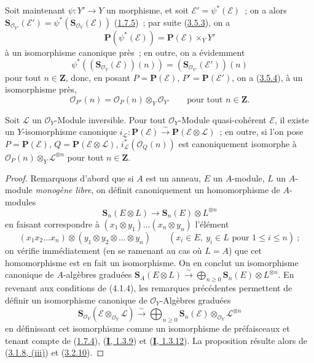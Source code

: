 \begin{env}[4.1.3]
\label{II.4.1.3-fr}
Soit maintenant $\psi:Y'\to Y$ un morphisme, et soit
$\mathcal{E}'=\psi^*(\mathcal{E})$~; on a alors
$\mathbf{S}_{\mathcal{O}_{Y'}}(\mathcal{E}')=
\psi^*(\mathbf{S}_{\mathcal{O}_Y}(\mathcal{E}))$
(\hyperref[II.1.7.5-fr]{1.7.5})~; par suite
(\hyperref[II.3.5.3-fr]{3.5.3}), on a
\[
\label{II.4.1.3.1-fr}
  \mathbf{P}(\psi^*(\mathcal{E}))=
  \mathbf{P}(\mathcal{E})\times_YY'
\tag{4.1.3.1}
\]
à un isomorphisme canonique près~; en outre, on a évidemment
\[
  \psi^*((\mathbf{S}_{\mathcal{O}_Y}(\mathcal{E}))(n))
  =(\mathbf{S}_{\mathcal{O}_{Y'}}(\mathcal{E}'))(n)
\]
pour tout $n\in\mathbf{Z}$, donc, en posant $P=\mathbf{P}(\mathcal{E})$,
$P'=\mathbf{P}(\mathcal{E}')$, on a
(\hyperref[II.3.5.4-fr]{3.5.4}), à un isomorphisme près,
\[
\label{II.4.1.3.2-fr}
  \mathcal{O}_{P'}(n)=\mathcal{O}_P(n)\otimes_Y\mathcal{O}_{Y'}
  \qquad\text{pour tout }n\in\mathbf{Z}.
\tag{4.1.3.2}
\]
\end{env}


\begin{proposition}[4.1.4]
\label{II.4.1.4-fr}
Soit $\mathcal{L}$ un $\mathcal{O}_Y$-Module inversible. Pour tout
$\mathcal{O}_Y$-Module quasi-cohérent $\mathcal{E}$, il existe un
$Y$-isomorphisme canonique
$i_{\mathcal{L}}:\mathbf{P}(\mathcal{E})\xrightarrow{\sim}
\mathbf{P}(\mathcal{E}\otimes\mathcal{L})$~; en outre, si l'on pose
$P=\mathbf{P}(\mathcal{E})$, $Q=\mathbf{P}(\mathcal{E}\otimes\mathcal{L})$,
$i_{\mathcal{L}}^*(\mathcal{O}_Q(n))$ est canoniquement isomorphe à
$\mathcal{O}_P(n)\otimes_Y\mathcal{L}^{\otimes n}$ pour tout
$n\in\mathbf{Z}$.
\end{proposition}

\begin{proof}
Remarquons d'abord que si $A$ est un anneau, $E$ un $A$-module, $L$ un
$A$-module \emph{monogène libre}, on définit canoniquement un homomorphisme
de $A$-modules
\[
  \mathbf{S}_n(E\otimes L)\longrightarrow
  \mathbf{S}_n(E)\otimes L^{\otimes n}
\]
en faisant correspondre à
$(x_1\otimes y_1)\ldots(x_n\otimes y_n)$ l'élément
\[
  (x_1x_2\ldots x_n)\otimes(y_1\otimes y_2\otimes\ldots\otimes y_n)
  \qquad(x_i\in E,\ y_i\in L\text{ pour }1\leq i\leq n)~;
\]
on vérifie immédiatement (en se ramenant au cas où $L=A$) que cet
homomorphisme est en fait un isomorphisme. On en conclut un isomorphisme
canonique de $A$-algèbres graduées
$\mathbf{S}_A(E\otimes L)\xrightarrow{\sim}
\bigoplus_{n\geq0}\mathbf{S}_n(E)\otimes L^{\otimes n}$. En revenant aux
conditions de (4.1.4), les remarques précédentes permettent de définir un
isomorphisme canonique de $\mathcal{O}_Y$-Algèbres graduées
\[
\label{II.4.1.4.1-fr}
  \mathbf{S}_{\mathcal{O}_Y}(\mathcal{E}\otimes_{\mathcal{O}_Y}\mathcal{L})
  \xrightarrow{\sim}
  \bigoplus_{n\geq0}\mathbf{S}_n(\mathcal{E})
  \otimes_{\mathcal{O}_Y}\mathcal{L}^{\otimes n}
\tag{4.1.4.1}
\]
en définissant cet isomorphisme comme un isomorphisme de préfaisceaux et
tenant compte de (\hyperref[II.1.7.4-fr]{1.7.4}),
(\hyperref[I.1.3.9-fr]{\textbf{I}, 1.3.9}) et
(\hyperref[I.1.3.12-fr]{\textbf{I}, 1.3.12}). La proposition résulte alors de
(\hyperref[II.3.1.8-fr]{3.1.8, (iii)}) et
(\hyperref[II.3.2.10-fr]{3.2.10}).
\end{proof}

